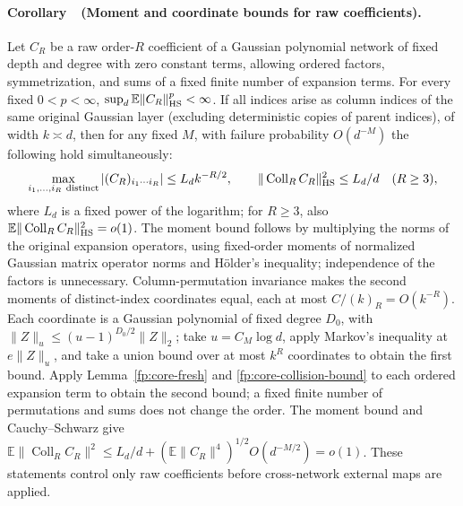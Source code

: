 \documentclass[a4paper]{tufte-handout}
\begin{document}
\begin{fullwidth}
\paragraph{Corollary~\thelemma\ (Moment and coordinate bounds for raw coefficients).}
\label{fp:core-raw-collision-expectation}
Let $C_R$ be a raw order-$R$ coefficient of a Gaussian polynomial network of fixed depth and degree with zero constant terms,
allowing ordered factors, symmetrization, and sums of a fixed finite number of expansion terms. For every fixed $0<p<\infty$,
$\sup_d\mathbb E\|C_R\|_{\rm HS}^p<\infty$.
If all indices arise as column indices of the same original Gaussian layer (excluding deterministic copies of parent indices), of width $k\asymp d$, then for any fixed $M$,
with failure probability $O(d^{-M})$ the following hold simultaneously:
\begin{equation}\label{fp:core-coordinate-bounds}
 \max_{i_1,\ldots,i_R\ \text{distinct}}|(C_R)_{i_1\cdots i_R}|
 \le L_d k^{-R/2},\qquad
 \|\operatorname{Coll}_R C_R\|_{\rm HS}^2\le L_d/d\quad(R\ge3),
\end{equation}
where $L_d$ is a fixed power of the logarithm; for $R\ge3$, also $\mathbb E\|\operatorname{Coll}_R C_R\|_{\rm HS}^2=o(1)$.
The moment bound follows by multiplying the norms of the original expansion operators, using fixed-order moments of normalized Gaussian matrix operator norms and H\"older's inequality; independence of the factors is unnecessary.
Column-permutation invariance makes the second moments of distinct-index coordinates equal, each at most
$C/(k)_R=O(k^{-R})$. Each coordinate is a Gaussian polynomial of fixed degree $D_0$,
with $\|Z\|_u\le(u-1)^{D_0/2}\|Z\|_2$; take $u=C_M\log d$, apply Markov's inequality at $e\|Z\|_u$,
and take a union bound over at most $k^R$ coordinates to obtain the first bound.
Apply Lemma~\ref{fp:core-fresh} and \eqref{fp:core-collision-bound} to each ordered expansion term to obtain the second bound;
a fixed finite number of permutations and sums does not change the order. The moment bound and Cauchy--Schwarz give
$\mathbb E\|\operatorname{Coll}_R C_R\|^2\le L_d/d+
(\mathbb E\|C_R\|^4)^{1/2}O(d^{-M/2})=o(1)$.
These statements control only raw coefficients before cross-network external maps are applied.


\end{fullwidth}
\end{document}
